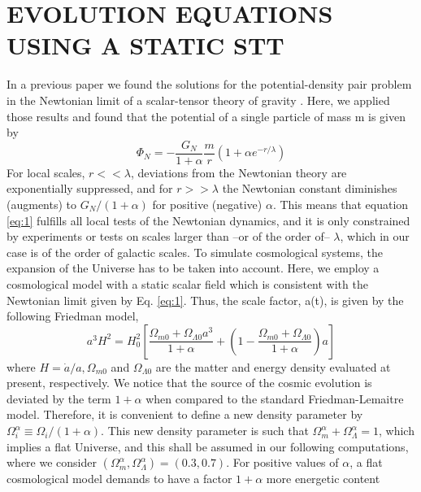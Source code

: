 \documentclass{article}
\begin{document}
\section{EVOLUTION EQUATIONS USING A STATIC STT}
In a previous paper we found the solutions for the
potential-density pair problem in the Newtonian limit of
a scalar-tensor theory of gravity \cite{11_RodrguezMeza2004}. Here, we applied
those results and found that the potential of a single particle
of mass m is given by \cite{12_Cervantes_Cota_2007}\\
\begin{equation}
\Phi_{N}=-\frac{G_{N}}{1+\alpha} \frac{m}{r}\left(1+\alpha e^{-r / \lambda}\right)
\label{eq:1}
\end{equation}
For local scales, $r << \lambda$, deviations from the Newtonian
theory are exponentially suppressed, and for $r >> \lambda$ the
Newtonian constant diminishes (augments) to $G_{N} /(1+\alpha)$ for positive (negative) $\alpha$. This means that equation
\ref{eq:1} fulfills all local tests of the Newtonian dynamics, and
it is only constrained by experiments or tests on scales
larger than –or of the order of– $\lambda$, which in our case is of
the order of galactic scales.
To simulate cosmological systems, the expansion of the
Universe has to be taken into account. Here, we employ a
cosmological model with a static scalar field which is consistent
with the Newtonian limit given by Eq. \ref{eq:1}. Thus,
the scale factor, a(t), is given by the following Friedman
model,\\
\begin{equation}
a^{3} H^{2}=H_{0}^{2}\left[\frac{\Omega_{m 0}+\Omega_{\Lambda 0} a^{3}}{1+\alpha}+\left(1-\frac{\Omega_{m 0}+\Omega_{\Lambda 0}}{1+\alpha}\right) a\right]
\label{eq:2}
\end{equation}
where $H=\dot{a} / a, \Omega_{m 0}$ and 
$\Omega_{\Lambda 0}$ are the matter and energy
density evaluated at present, respectively. We notice that
the source of the cosmic evolution is deviated by the term $1+\alpha$ when compared to the standard Friedman-Lemaitre
model. Therefore, it is convenient to define a new density
parameter by $\Omega_{i}^{\alpha} \equiv \Omega_{i} /(1+\alpha)$. This new density parameter is such that $\Omega_{m}^{\alpha}+\Omega_{\Lambda}^{\alpha}=1$,  which implies a
flat Universe, and this shall be assumed in our following
computations, where we consider $\left(\Omega_{m}^{\alpha}, \Omega_{\Lambda}^{\alpha}\right)=(0.3,0.7)$. 
For positive values of $\alpha$, a flat cosmological model demands
to have a factor $1 + \alpha$ more energetic content
\end{document}
